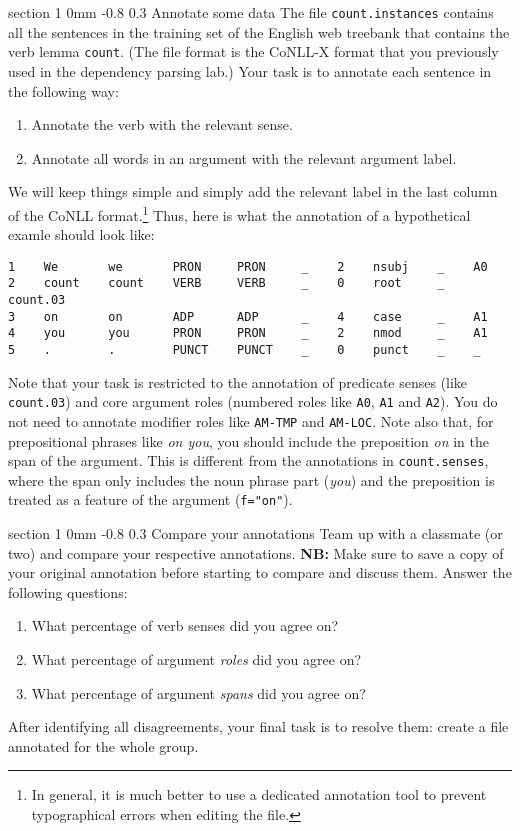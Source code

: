 \documentclass[11pt]{article}
\makeatletter
\newcommand{\newsec}[2]{\section{#1}\label{sec:#2}\noindent}
\renewcommand{\section}{\@startsection
{section}%
{1}%
{0mm}%
{-0.8\baselineskip}%
{0.3\baselineskip}%
{\bfseries\large}}%
\makeatother
\begin{document}
\newsec{Annotate some data }{annotate}%
The file {\tt count.instances} contains all the sentences in the
training set of the English web treebank that contains the verb lemma
{\tt count}. (The file format is the CoNLL-X format that you
previously used in the dependency parsing lab.) Your task is to
annotate each sentence in the following way:
\begin{enumerate}[noitemsep,topsep=0.2cm]
\item  Annotate the verb with the relevant sense.
\item  Annotate all words in an argument with the relevant argument label.
\end{enumerate}
We will keep things simple and simply add the relevant label in the
last column of the CoNLL format.\footnote{In general, it is much
  better to use a dedicated annotation tool to prevent typographical
  errors when editing the file.}  Thus, here is what the annotation of
a hypothetical examle should look like:
\begin{Verbatim}[fontsize=\small,xleftmargin=\parindent]
1    We       we       PRON     PRON     _    2    nsubj    _    A0
2    count    count    VERB     VERB     _    0    root     _    count.03
3    on       on       ADP      ADP      _    4    case     _    A1
4    you      you      PRON     PRON     _    2    nmod     _    A1
5    .        .        PUNCT    PUNCT    _    0    punct    _    _
\end{Verbatim}
Note that your task is restricted to the annotation of predicate
senses (like {\tt count.03}) and core argument roles (numbered roles
like {\tt A0}, {\tt A1} and {\tt A2}). You do not need to annotate
modifier roles like {\tt AM-TMP} and {\tt AM-LOC}.
Note also that, for prepositional phrases like \emph{on you}, you should
include the preposition \emph{on} in the span of the argument. This is different from
the annotations in {\tt count.senses}, where the span only includes the 
noun phrase part (\emph{you}) and the preposition is treated as a feature
of the argument ({\tt f="on"}). 

\newsec{Compare your annotations }{compare}%
Team up with a classmate (or two) and compare your respective
annotations. {\bf NB:} Make sure to save a copy of your original
annotation before starting to compare and discuss them.  Answer the
following questions:
\begin{enumerate}[noitemsep,topsep=0.2cm]
\item  What percentage of verb senses did you agree on? 
\item  What percentage of argument {\em roles} did you agree on?
\item  What percentage of argument {\em spans} did you agree on?
\end{enumerate}
After identifying all disagreements, your final task is to resolve
them: create a file annotated for the whole group.
\end{document}
